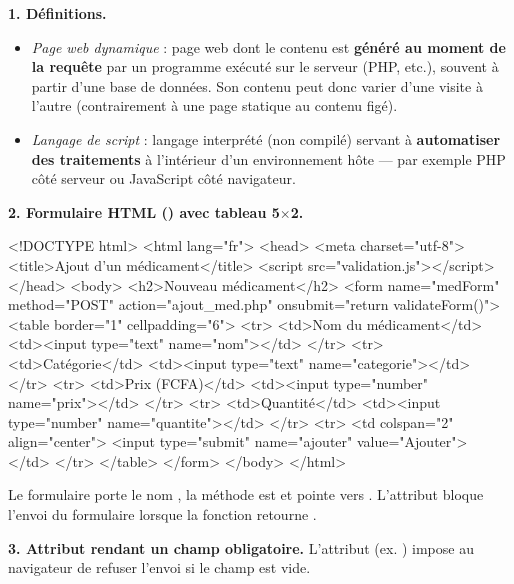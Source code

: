 \textbf{1. Définitions.}
\begin{itemize}
  \item \emph{Page web dynamique} : page web dont le contenu est
  \textbf{généré au moment de la requête} par un programme exécuté sur le serveur (PHP,
  etc.), souvent à partir d'une base de données. Son contenu peut donc varier d'une visite
  à l'autre (contrairement à une page statique au contenu figé).
  \item \emph{Langage de script} : langage interprété (non compilé) servant à
  \textbf{automatiser des traitements} à l'intérieur d'un environnement hôte — par exemple
  PHP côté serveur ou JavaScript côté navigateur.
\end{itemize}

\medskip
\textbf{2. Formulaire HTML () avec tableau 5$\times$2.}

\begin{codehtml}
<!DOCTYPE html>
<html lang="fr">
<head>
  <meta charset="utf-8">
  <title>Ajout d'un médicament</title>
  <script src="validation.js"></script>
</head>
<body>
  <h2>Nouveau médicament</h2>
  <form name="medForm" method="POST" action="ajout_med.php"
        onsubmit="return validateForm()">
    <table border="1" cellpadding="6">
      <tr>
        <td>Nom du médicament</td>
        <td><input type="text" name="nom"></td>
      </tr>
      <tr>
        <td>Catégorie</td>
        <td><input type="text" name="categorie"></td>
      </tr>
      <tr>
        <td>Prix (FCFA)</td>
        <td><input type="number" name="prix"></td>
      </tr>
      <tr>
        <td>Quantité</td>
        <td><input type="number" name="quantite"></td>
      </tr>
      <tr>
        <td colspan="2" align="center">
          <input type="submit" name="ajouter" value="Ajouter">
        </td>
      </tr>
    </table>
  </form>
</body>
</html>
\end{codehtml}


\begin{remarque}
Le formulaire porte le nom , la méthode est  et 
pointe vers . L'attribut 
bloque l'envoi du formulaire lorsque la fonction retourne .
\end{remarque}

\medskip
\textbf{3. Attribut rendant un champ obligatoire.} L'attribut  (ex.
) impose au navigateur de refuser l'envoi
si le champ est vide.

